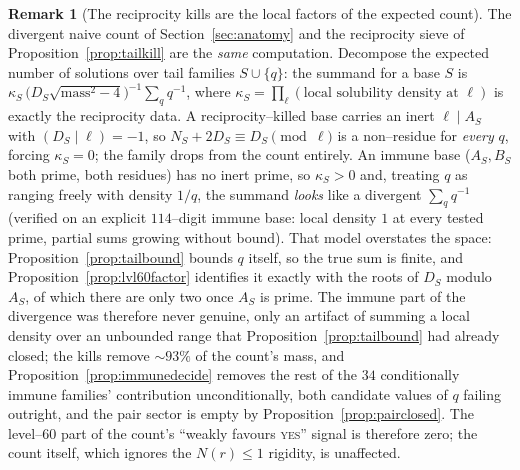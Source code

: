 \documentclass[11pt]{article}
\theoremstyle{definition}
\newtheorem{remark}[theorem]{Remark}
\begin{document}
\begin{remark}[The reciprocity kills are the local factors of the expected count]\label{rem:killcount}
The divergent naive count of Section~\ref{sec:anatomy} and the reciprocity sieve of
Proposition~\ref{prop:tailkill} are the \emph{same} computation. Decompose the expected number of
solutions over tail families $S\cup\{q\}$: the summand for a base $S$ is
$\kappa_S\,\bigl(D_S\sqrt{\mathrm{mass}^2-4}\bigr)^{-1}\sum_q q^{-1}$, where
$\kappa_S=\prod_\ell(\text{local solubility density at }\ell)$ is exactly the reciprocity data.
A reciprocity--killed base carries an inert $\ell\mid A_S$ with $(D_S\mid\ell)=-1$, so
$N_S+2D_S\equiv D_S\pmod\ell$ is a non--residue for \emph{every} $q$, forcing $\kappa_S=0$; the
family drops from the count entirely. An immune base ($A_S,B_S$ both prime, both residues) has no
inert prime, so $\kappa_S>0$ and, treating $q$ as ranging freely with density $1/q$, the summand
\emph{looks} like a divergent $\sum_q q^{-1}$ (verified on an explicit $114$--digit immune base: local
density $1$ at every tested prime, partial sums growing without bound). That model overstates the
space: Proposition~\ref{prop:tailbound} bounds $q$ itself, so the true sum is finite, and
Proposition~\ref{prop:lvl60factor} identifies it exactly with the roots of $D_S$ modulo $A_S$, of which
there are only two once $A_S$ is prime. The immune part of the divergence was therefore never genuine,
only an artifact of summing a local density over an unbounded range that
Proposition~\ref{prop:tailbound} had already closed; the kills remove ${\sim}93\%$ of the count's mass,
and Proposition~\ref{prop:immunedecide} removes the rest of the $34$ conditionally immune families'
contribution unconditionally, both candidate values of $q$ failing outright, and the pair sector is empty by
Proposition~\ref{prop:pairclosed}. The level--$60$ part of the count's ``weakly favours \textsc{yes}'' signal is therefore
zero; the count itself, which ignores the $N(r)\le1$ rigidity, is unaffected.
\end{remark}
\end{document}
